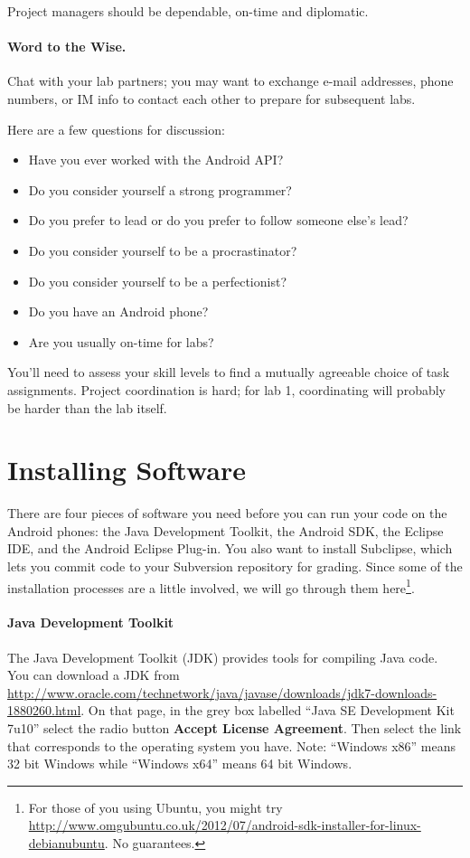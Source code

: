 \documentclass[10pt]{article}
\begin{document}
Project managers should be dependable, on-time and diplomatic.

\paragraph{Word to the Wise.} Chat with your lab partners; you may want to exchange e-mail addresses, phone numbers, or IM info to contact each other to prepare for subsequent labs.

Here are a few questions for discussion:
\begin{itemize}
\item Have you ever worked with the Android API?
\item Do you consider yourself a strong programmer?
\item Do you prefer to lead or do you prefer to follow someone else's lead?
\item Do you consider yourself to be a procrastinator?
\item Do you consider yourself to be a perfectionist?
\item Do you have an Android phone? 
\item Are you usually on-time for labs?
\end{itemize}

You'll need to assess your skill levels to
find a mutually agreeable choice of task assignments. 
Project coordination is hard; for lab 1, coordinating
will probably be harder than the lab itself.

\section{Installing Software}

There are four pieces of software you need before you can run your code on the Android phones: the Java Development Toolkit, the Android SDK, the Eclipse IDE, and the Android Eclipse Plug-in. You also want to install Subclipse, which lets you commit code to your Subversion repository for grading. Since some of the installation processes are a little involved, we will go through them here\footnote{For those of you using Ubuntu, you might try \url{http://www.omgubuntu.co.uk/2012/07/android-sdk-installer-for-linux-debianubuntu}. No guarantees.}.

\paragraph{Java Development Toolkit}
The Java Development Toolkit (JDK) provides tools for compiling Java code. You can download a JDK from \url{http://www.oracle.com/technetwork/java/javase/downloads/jdk7-downloads-1880260.html}. On that page, in the grey box labelled ``Java SE Development Kit 7u10'' select the radio button \textbf{Accept License Agreement}. Then select the link that corresponds to the operating system you have. Note: ``Windows x86'' means 32 bit Windows while ``Windows x64'' means 64 bit Windows.
\end{document}
